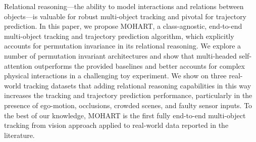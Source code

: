 	Relational reasoning---the ability to model interactions and relations between objects---is valuable for robust multi-object tracking and pivotal for trajectory prediction. In this paper, we propose MOHART, a class-agnostic, end-to-end multi-object tracking and trajectory prediction algorithm, which explicitly accounts for permutation invariance in its relational reasoning. We explore a number of permutation invariant architectures and show that multi-headed self-attention outperforms the provided baselines and better accounts for complex physical interactions in a challenging toy experiment. We show on three real-world tracking datasets that adding relational reasoning capabilities in this way increases the tracking and trajectory prediction performance, particularly in the presence of ego-motion, occlusions, crowded scenes, and faulty sensor inputs. To the best of our knowledge, MOHART is the first fully end-to-end multi-object tracking from vision approach applied to real-world data reported in the literature. 